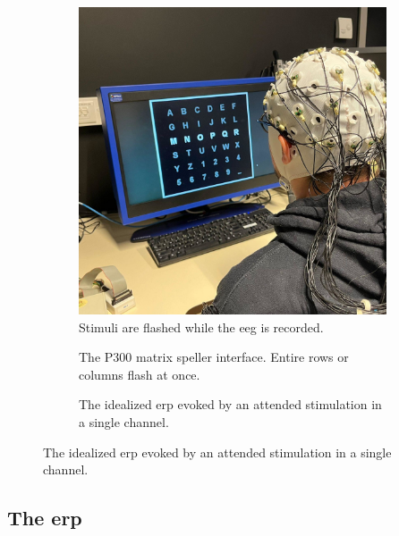 \begin{figure}[t]
  \centering
  \begin{subfigure}[t]{.45\textwidth}
  \includegraphics[width=\textwidth, height=\textwidth]{figures/bci/illustration}
    \caption{Stimuli are flashed while the \acs{eeg} is recorded.}
  \end{subfigure}\hfill%
  \begin{subfigure}[t]{.45\textwidth}
    
    \caption{The P300 matrix speller interface. Entire rows or columns flash at once.}
  \end{subfigure}

  \begin{subfigure}[t]{.45\textwidth}
    
    \caption{The idealized \ac{erp} evoked by an attended stimulation in a single
    channel.}
    \label{fig:bci/erp}
  \end{subfigure}%
\end{figure}

\subsection{The \acl{erp}}
\label{sec:bci/oddball/erp}

